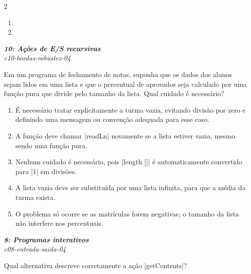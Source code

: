 \documentclass[a4paper,10pt,brazil]{article}
\begin{document}
\begin{multicols}{2}
\begin{enumerate}
  \item {}

  \item {}


\end{enumerate}

\begin{flushright}
  \footnotesize
  \textit{\textbf{10: Ações de E/S recursivas}}\\
  \textit{c10-bordas-robustez-04}\\

\end{flushright}
Em um programa de fechamento de notas, suponha que os dados dos alunos sejam lidos em uma lista e que o percentual de aprovados seja calculado por uma função pura que divide pelo tamanho da lista. Qual cuidado é necessário?

\begin{enumerate}
  \item É necessário tratar explicitamente a turma vazia, evitando divisão por zero e definindo uma mensagem ou convenção adequada para esse caso.

  \item A função deve chamar \haskellinline|readLn| novamente se a lista estiver vazia, mesmo sendo uma função pura.

  \item Nenhum cuidado é necessário, pois \haskellinline|length []| é automaticamente convertido para \haskellinline|1| em divisões.

  \item A lista vazia deve ser substituída por uma lista infinita, para que a média da turma exista.

  \item O problema só ocorre se as matrículas forem negativas; o tamanho da lista não interfere nos percentuais.


\end{enumerate}

\begin{flushright}
  \footnotesize
  \textit{\textbf{8: Programas interativos}}\\
  \textit{c08-entrada-saida-04}\\

\end{flushright}
Qual alternativa descreve corretamente a ação \haskellinline|getContents|?


\end{multicols}
\end{document}
